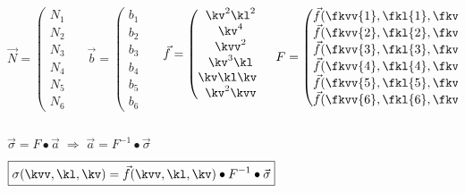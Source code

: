 {    \begin{columns}[T]
        \begin{column}{0.18\textwidth}
            $ \vec{N} = \begin{pmatrix} N_1 \\ N_2 \\ N_3 \\ N_4 \\ N_5 \\ N_6 \end{pmatrix} $
        \end{column}
        \begin{column}{0.15\textwidth}
            $ \vec{b} = \begin{pmatrix} b_1 \\ b_2 \\ b_3 \\ b_4 \\ b_5 \\ b_6 \end{pmatrix} $
        \end{column}
        \begin{column}{0.25\textwidth}
            $ \vec{f} = \begin{pmatrix} \kv^2 \kl^2 \\ \kv^4 \\ \kvv^2 \\ \kv^3 \kl \\ \kv \kl \kvv \\ \kv^2 \kvv \end{pmatrix} $
        \end{column}
        \begin{column}{0.4\textwidth}
            $ F = \begin{pmatrix}
                \vec{f}(\fkvv{1}, \fkl{1}, \fkv{1}) \\
                \vec{f}(\fkvv{2}, \fkl{2}, \fkv{2}) \\
                \vec{f}(\fkvv{3}, \fkl{3}, \fkv{3}) \\
                \vec{f}(\fkvv{4}, \fkl{4}, \fkv{4}) \\
                \vec{f}(\fkvv{5}, \fkl{5}, \fkv{5}) \\
                \vec{f}(\fkvv{6}, \fkl{6}, \fkv{6}) \\
            \end{pmatrix} $
        \end{column}
    \end{columns}

    \vspace{10mm}

    $ \vec{\sigma} = F \bullet \vec{a} \; \Longrightarrow \; \vec{a} = F^{-1} \bullet \vec{\sigma} $

    \vspace{10mm}

    $ \boxed{ \sigma(\kvv,\kl,\kv) = \vec{f}(\kvv,\kl,\kv) \bullet F^{-1} \bullet \vec{\sigma} } $
}


